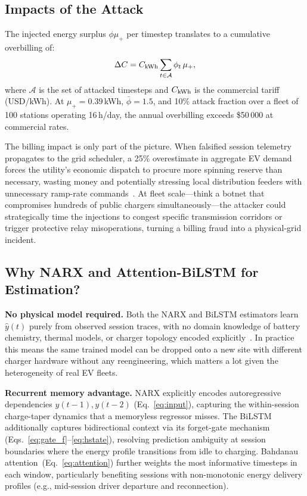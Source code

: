 \documentclass[journal]{IEEEtran}
\begin{document}
\subsection{Impacts of the Attack}

The injected energy surplus $\phi\mu_+$ per timestep translates
to a cumulative overbilling of:
\begin{equation}
  \Delta C = C_{\rm kWh}
    \sum_{t\in\mathcal{A}} \phi_t\,\mu_+,
  \label{eq:billing}
\end{equation}
where $\mathcal{A}$ is the set of attacked timesteps and
$C_{\rm kWh}$ is the commercial tariff (USD/kWh).
At $\mu_+=0.39$\,kWh, $\bar{\phi}=1.5$, and 10\% attack fraction
over a fleet of 100 stations operating 16\,h/day, the annual
overbilling exceeds \$50\,000 at commercial rates.

The billing impact is only part of the picture.
When falsified session telemetry propagates to the grid scheduler,
a 25\% overestimate in aggregate EV demand forces the utility's
economic dispatch to procure more spinning reserve than necessary,
wasting money and potentially stressing local distribution
feeders with unnecessary ramp-rate commands~\cite{sun2020charging}.
At fleet scale---think a botnet that compromises hundreds of public
chargers simultaneously---the attacker could strategically time the
injections to congest specific transmission corridors or trigger
protective relay misoperations, turning a billing fraud into a
physical-grid incident.

\subsection{Why NARX and Attention-BiLSTM for Estimation?}
\label{sec:why}

\textbf{No physical model required.}
Both the NARX and BiLSTM estimators learn $\hat{y}(t)$ purely
from observed session traces, with no domain knowledge of battery
chemistry, thermal models, or charger topology encoded
explicitly~\cite{basumatary2025}.
In practice this means the same trained model can be dropped onto
a new site with different charger hardware without any
reengineering, which matters a lot given the heterogeneity of
real EV fleets.

\textbf{Recurrent memory advantage.}
NARX explicitly encodes autoregressive dependencies
$y(t{-}1),y(t{-}2)$ (Eq.~\eqref{eq:input}), capturing the
within-session charge-taper dynamics that a memoryless regressor
misses.
The BiLSTM additionally captures bidirectional context via its
forget-gate mechanism (Eqs.~\eqref{eq:gate_f}--\eqref{eq:hstate}),
resolving prediction ambiguity at session boundaries where the
energy profile transitions from idle to charging.
Bahdanau attention~(Eq.~\eqref{eq:attention}) further weights
the most informative timesteps in each window, particularly
benefiting sessions with non-monotonic energy delivery profiles
(e.g., mid-session driver departure and reconnection).
\end{document}
